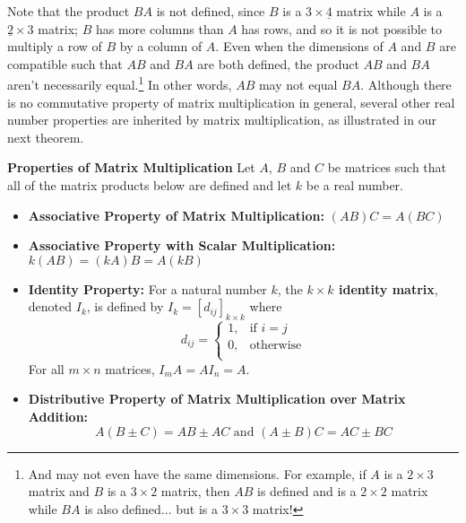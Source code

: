 Note that the product $BA$ is not defined, since $B$ is a $3 \times \underline{4}$ matrix while $A$ is a $\underline{2} \times 3$ matrix;  $B$ has more columns than $A$ has rows, and so it is not possible to multiply a row of $B$ by a column of $A$.  Even when the dimensions of $A$ and $B$ are compatible such that $AB$ and $BA$ are both defined, the product $AB$ and $BA$ aren't necessarily equal.\footnote{And may not even have the same dimensions.  For example, if $A$ is a $2 \times 3$ matrix and $B$ is a $3 \times 2$ matrix, then $AB$ is defined and is a $2 \times 2$ matrix while $BA$ is also defined... but is a $3 \times 3$ matrix!} In other words, $AB$ may not equal $BA$. Although there is no commutative property of matrix multiplication in general, several other real number properties are inherited by matrix multiplication, as illustrated in our next theorem.

\smallskip
\colorbox{ResultColor}{\bbm
\begin{thm}  \label{matrixmultprops}\textbf{Properties of Matrix Multiplication}  Let $A$, $B$ and $C$ be matrices such that all of the matrix products below are defined and let $k$ be a real number.

\begin{itemize}

\item  \textbf{Associative Property of Matrix Multiplication:}  $(AB)C = A(BC)$ 

\item  \textbf{Associative Property with Scalar Multiplication:} $k(AB) = (kA)B = A(kB)$

\item  \textbf{Identity Property:}   For a natural number $k$, the \textbf{\boldmath $k \times k$ identity matrix}, denoted $I_{k}$, is defined by $I_{k} = \left[d_{ij} \right]_{k \times k}$ where\[ d_{ij} = \left\{ \begin{array}{rl} 1, & \text{if $i=j$} \\ 0, & \text{otherwise} \\ \end{array} \right.\]For all $m \times n$ matrices,  $I_{m}A = AI_{n} = A$. 

\item  \textbf{Distributive Property of Matrix Multiplication over Matrix Addition:}   \[A(B \pm C) = AB \pm AC \mbox{ and } (A \pm B)C = AC \pm BC\]

\end{itemize}

\end{thm}
\ebm}
\smallskip

